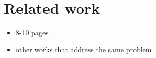 \section{Related work}
\label{sec:relatedwork}

\begin{itemize} 
    \item 8-10 pages
    \item other works that address the same problem 
\end{itemize}